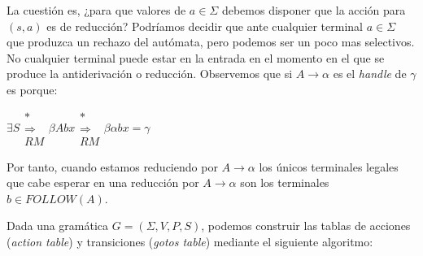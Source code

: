 La cuestión es, ¿para que valores de $a \in \Sigma$ debemos disponer que
la acción para $(s, a)$ es de reducción?
Podríamos decidir que ante cualquier terminal $a \in \Sigma$
que produzca un rechazo del autómata, pero podemos ser un poco mas
selectivos. No cualquier terminal puede estar en la entrada en el momento
en el que se produce la antiderivación o reducción. 
Observemos que si $A \rightarrow \alpha$ es el \emph{handle}
de $\gamma$ es porque:

\begin{center}
$\exists S \begin{array}{c} *\\ \Longrightarrow \\ {\scriptstyle RM} \end{array} \beta A b x \begin{array}{c} *\\ \Longrightarrow \\ {\scriptstyle RM} \end{array}  
\beta \alpha b x = \gamma$
\end{center}

Por tanto, cuando estamos reduciendo por $A \rightarrow \alpha$
los únicos terminales legales que cabe esperar en una reducción por $A \rightarrow \alpha$ son los terminales $b \in FOLLOW(A)$.


Dada una gramática $G=(\Sigma,V,P,S)$, podemos construir las tablas de acciones (\emph{action table}) y  transiciones (\emph{gotos table}) mediante el siguiente algoritmo:

